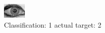 \begin{figure}[h!]
\begin{center}
\includegraphics[width=0.60\columnwidth]{figures/ID1992_class_1_target_2.png}
\end{center}
\caption{ Classification: 1 actual target: 2}
\label{fig:ID1992_class_1_target_2}
\end{figure}
